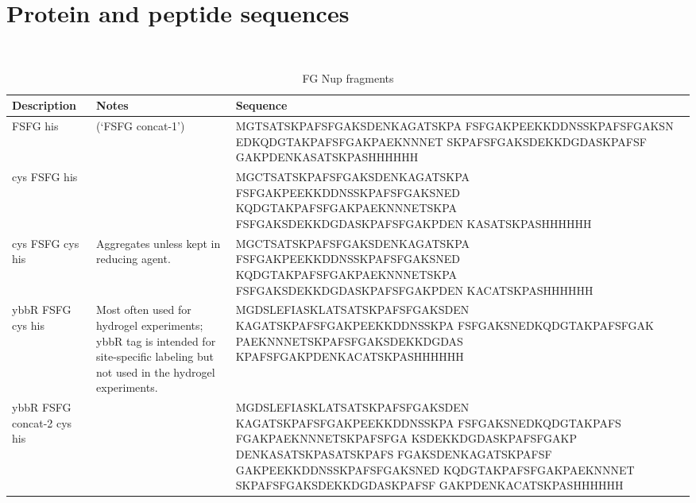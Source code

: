 \chapter{Protein and peptide sequences}~\label{appx:sequences}
\begin{table}[b!]
\centering
  \caption{FG Nup fragments}
    \label{table:Nups}
    \begin{tabular}{p{3.5cm}p{4cm}p{8cm}}
      Description & Notes &Sequence \\
      \hline
      FSFG his & (`FSFG concat-1') & MGTSATSKPAFSFGAKSDENKAGATSKPA
FSFGAKPEEKKDDNSSKPAFSFGAKSN
EDKQDGTAKPAFSFGAKPAEKNNNET
SKPAFSFGAKSDEKKDGDASKPAFSF
GAKPDENKASATSKPASHHHHHH\\
      \hline
	cys FSFG his & & MGCTSATSKPAFSFGAKSDENKAGATSKPA
FSFGAKPEEKKDDNSSKPAFSFGAKSNED
KQDGTAKPAFSFGAKPAEKNNNETSKPA
FSFGAKSDEKKDGDASKPAFSFGAKPDEN
KASATSKPASHHHHHH\\
      \hline
	cys FSFG cys his& Aggregates unless kept in reducing agent. & MGCTSATSKPAFSFGAKSDENKAGATSKPA
FSFGAKPEEKKDDNSSKPAFSFGAKSNED
KQDGTAKPAFSFGAKPAEKNNNETSKPA
FSFGAKSDEKKDGDASKPAFSFGAKPDEN
KACATSKPASHHHHHH \\
      \hline
	ybbR FSFG cys his & Most often used for hydrogel experiments; ybbR tag is intended for site-specific labeling but not used in the hydrogel experiments.& MGDSLEFIASKLATSATSKPAFSFGAKSDEN
KAGATSKPAFSFGAKPEEKKDDNSSKPA
FSFGAKSNEDKQDGTAKPAFSFGAK
PAEKNNNETSKPAFSFGAKSDEKKDGDAS
KPAFSFGAKPDENKACATSKPASHHHHHH\\
\hline
	ybbR FSFG concat-2 cys his& & MGDSLEFIASKLATSATSKPAFSFGAKSDEN
KAGATSKPAFSFGAKPEEKKDDNSSKPA
FSFGAKSNEDKQDGTAKPAFS
FGAKPAEKNNNETSKPAFSFGA
KSDEKKDGDASKPAFSFGAKP
DENKASATSKPASATSKPAFS
FGAKSDENKAGATSKPAFSF
GAKPEEKKDDNSSKPAFSFGAKSNED
KQDGTAKPAFSFGAKPAEKNNNET
SKPAFSFGAKSDEKKDGDASKPAFSF
GAKPDENKACATSKPASHHHHHH\\
\hline
    \end{tabular}
\end{table}
\newpage
